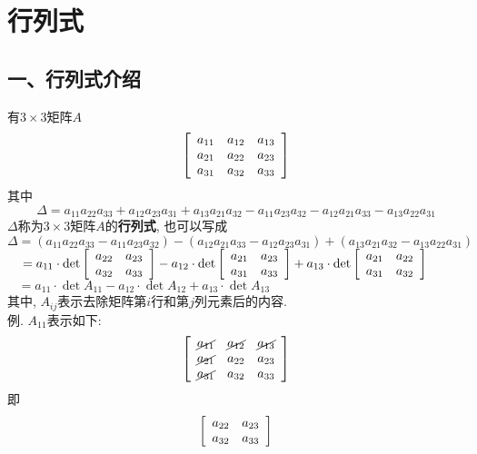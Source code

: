 \chapter{行列式}
\section{一、行列式介绍}
有$3\times 3$矩阵$A$
\[\left[\begin{array}{l l l}
a_{11} & a_{12} & a_{13}\\
a_{21} & a_{22} & a_{23}\\
a_{31} & a_{32} & a_{33}
\end{array}\right]\]
其中
\[\Delta=a_{11}a_{22}a_{33}+a_{12}a_{23}a_{31}+a_{13}a_{21}a_{32}-a_{11}a_{23}a_{32}-a_{12}a_{21}a_{33}-a_{13}a_{22}a_{31}\]
$\Delta$称为$3\times 3$矩阵$A$的\textbf{行列式}, 也可以写成\\
$\Delta=(a_{11}a_{22}a_{33}-a_{11}a_{23}a_{32})-(a_{12}a_{21}a_{33}-a_{12}a_{23}a_{31})+(a_{13}a_{21}a_{32}-a_{13}a_{22}a_{31})$\\[1ex]
$\phantom{\Delta}=a_{11}\cdot\det\left[\begin{array}{l l}
a_{22} & a_{23}\\
a_{32} & a_{33}
\end{array}\right]-a_{12}\cdot\det\left[\begin{array}{l l}
a_{21} & a_{23}\\
a_{31} & a_{33}
\end{array}\right]+a_{13}\cdot\det\left[\begin{array}{l l}
a_{21} & a_{22}\\
a_{31} & a_{32}
\end{array}\right]$\\[1ex]
$\phantom{\Delta}=a_{11}\cdot\det A_{11}-a_{12}\cdot\det A_{12}+a_{13}\cdot\det A_{13}$\\
其中, $A_{ij}$表示去除矩阵第$i$行和第$j$列元素后的内容.\\
例. $A_{11}$表示如下:\\
\[\left[\begin{array}{l l l}
\cancel{a_{11}} & \cancel{a_{12}} & \cancel{a_{13}}\\
\cancel{a_{21}} & a_{22} & a_{23}\\
\cancel{a_{31}} & a_{32} & a_{33}
\end{array}\right]\]
即
\[\left[\begin{array}{l l}
a_{22} & a_{23}\\
a_{32} & a_{33}
\end{array}\right]\]\\[2ex]

